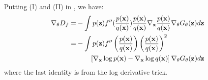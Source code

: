 \begin{proofs}
{\begin{align*}
\end{align*}
}%
Putting (I) and (II) in , we have:
{
\begin{align*}
    \nabla_\theta D_f = &-\int p({\mathbf{z}}) f''(\frac{p({\mathbf{x}})}{q({\mathbf{x}})}) \frac{p({\mathbf{x}})}{q({\mathbf{x}})} \nabla_{\mathbf{x}} \frac{p({\mathbf{x}})}{q({\mathbf{x}})} \nabla_\theta G_\theta({\mathbf{z}}) d{\mathbf{z}} \\
= &-\int p({\mathbf{z}}) f''\left(\frac{p({\mathbf{x}})}{q({\mathbf{x}})}\right)\left(\frac{p({\mathbf{x}})}{q({\mathbf{x}})}\right)^2\\
    & \quad \quad \left[\nabla_{\mathbf{x}} \log p({\mathbf{x}}) - \nabla_{\mathbf{x}} \log q({\mathbf{x}})\right] \nabla_\theta G_\theta({\mathbf{z}}) d{\mathbf{z}} 
\end{align*}
}%
where the last identity is from the log derivative trick. 
\end{proofs}
\iffalse
The second term in \Eqref{eq:full-grad} can be further simplified into:
    \begin{align*}
 &\int p_{\textrm{prior}}(\rvz) f'\left(\frac{p(\rvx)}{q(\rvx)}\right)\frac{p(\rvx)}{q^2(\rvx)} \nabla_\theta q(G_{\theta_{\textrm{sg}}}(\rvz)) dz \\
 &\overset{\rvx=G_\theta(\rvz)}{=} \int q(\rvx) f'\left(\frac{p(\rvx)}{q(\rvx)}\right)\frac{p(\rvx)}{q^2(\rvx)} \nabla_\theta q(\rvx) dx \\
&=\nabla_\theta \int f'\left(\frac{p(\rvx)}{q_{\textrm{sg}}(\rvx)}\right)\frac{p(\rvx)}{q_{\textrm{sg}}(\rvx)}  q(\rvx) dx \\
    &\overset{\rvx=G_\theta(\rvz)}{=} \nabla_\theta \int f'\left(\frac{p(G_\theta(\rvz))}{q(G_\theta(\rvz))}\right)\frac{p(G_\theta(\rvz))}{q(G_\theta(\rvz))} p_{\textrm{prior}}(\rvz) d\rvz \\
&=  \int p_{\textrm{prior}}(\rvz) f''\left(\frac{p(\rvx)}{q(\rvx)}\right)\nabla_\rvx\frac{p(\rvx)}{q(\rvx)}\frac{p(\rvx)}{q(\rvx)} \nabla_\theta G_\theta(\rvz) d\rvz \\
    &\qquad + \int p_{\textrm{prior}}(\rvz) f'\left(\frac{p(\rvx)}{q(\rvx)}\right)\nabla_\rvx\frac{p(\rvx)}{q(\rvx)} \nabla_\theta G_\theta(\rvz) d\rvz\\
    &=  \int p_{\textrm{prior}}(\rvz) f''\left(\frac{p(\rvx)}{q(\rvx)}\right)(\frac{p(\rvx)}{q(\rvx)})^2\\
    & \qquad  [\nabla_\rvx \log p(\rvx) - \nabla_\rvx \log q(\rvx)] \nabla_\theta G_\theta(\rvz) d\rvz \\
    &\qquad + \int p_{\textrm{prior}}(\rvz)  \left(f'\left(\frac{p(\rvx)}{q(\rvx)}\right)\nabla_\rvx\frac{p(\rvx)}{q(\rvx)}\right) \nabla_\theta G_\theta(\rvz) d\rvz
    \numberthis\label{eq:full-2}
\end{align*}
where ${\textrm{sg}}$ stands for stop gradient. We conclude the theorem by plugging \Eqref{eq:full-2} into \Eqref{eq:full-grad}.
\fi



